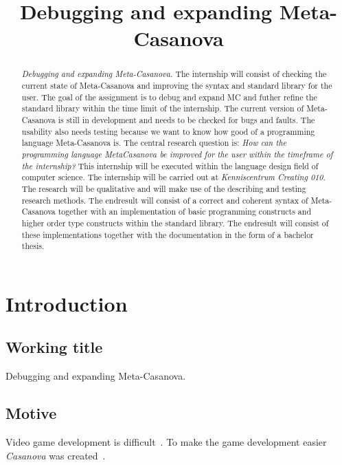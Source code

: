 



\title{Debugging and expanding Meta-Casanova}
\author{\writer}

\begin{titlepage}
   
\end{titlepage}

\begin{abstract}
   \emph{Debugging and expanding Meta-Casanova.}
   The internship will consist of checking the current state of Meta-Casanova and improving the syntax and standard library for the user.
The goal of the assignment is to debug and expand MC and futher refine the standard library within the time limit of the internship.
The current version of Meta-Casanova is still in development and needs to be checked for bugs and faults.
The usability also needs testing because we want to know how good of a programming language Meta-Casanova is.
The central research question is: \emph{How can the programming language MetaCasanova be improved for the user within the timeframe of the internship?}
This internship will be executed within the language design field of computer science.
The internship will be carried out at \emph{Kenniscentrum Creating 010}.
The research will be qualitative and will make use of the describing and testing research methods.
The endresult will consist of a correct and coherent syntax of Meta-Casanova together with an implementation of basic programming constructs and higher order type constructs within the standard library.
The endresult will consist of these implementations together with the documentation in the form of a bachelor thesis.
\end{abstract}

\section{Introduction}
\subsection{Working title}
Debugging and expanding Meta-Casanova.

\subsection{Motive}
Video game development is difficult~\cite{blow2004game}.
To make the game development easier \emph{Casanova} was created~\cite{maggiore2011designing}.

